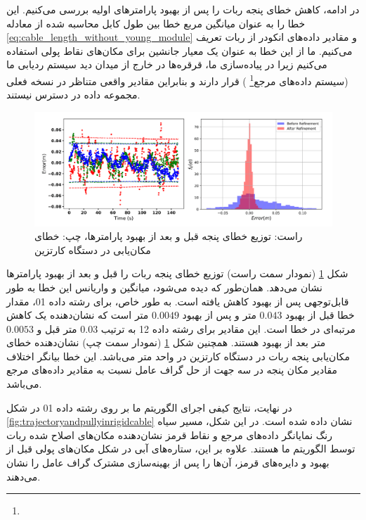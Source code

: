 در ادامه، کاهش خطای پنجه ربات را پس از بهبود پارامترهای اولیه بررسی می‌کنیم. این خطا را به عنوان میانگین مربع خطا بین طول کابل محاسبه شده از معادله 
\ref{eq:cable_length_without_young_module}
 و مقادیر داده‌های انکودر از ربات تعریف می‌کنیم. ما از این خطا به عنوان یک معیار جانشین برای مکان‌های نقاط پولی استفاده می‌کنیم زیرا در پیاده‌سازی ما، قرقره‌ها در خارج از میدان دید سیستم ردیابی ما (سیستم داده‌های مرجع\footnote{}
 ) قرار دارند و بنابراین مقادیر واقعی متناظر در نسخه فعلی مجموعه داده در دسترس نیستند. 
 
 \begin{figure}
 	\centering
 	\includegraphics[width=0.9\linewidth]{img/calibration_result_rigid}
 	\caption{ راست: توزیع خطای پنجه قبل و بعد از بهبود پارامترها، چپ: خطای مکان‌یابی در دستگاه کارتزین}
 	\label{fig:calibrationresultrigid}
 \end{figure}
 
 شکل 
 \ref{fig:calibrationresultrigid}
 (نمودار سمت راست)
 توزیع خطای پنجه ربات را قبل و بعد از بهبود پارامترها نشان می‌دهد. همان‌طور که دیده می‌شود، میانگین و واریانس این خطا به طور قابل‌توجهی پس از بهبود کاهش یافته است. به طور خاص، برای رشته داده 01، مقدار خطا قبل از بهبود $0.043$ متر و پس از بهبود $0.0049$ متر است که نشان‌دهنده یک کاهش مرتبه‌ای در خطا است. این مقادیر برای رشته داده 12 به ترتیب $0.03$ متر قبل و $0.0053$ متر بعد از بهبود هستند. همچنین شکل 
  \ref{fig:calibrationresultrigid}
  (نمودار سمت چپ)
  نشان‌دهنده خطای مکان‌یابی پنجه ربات در دستگاه کارتزین در واحد متر می‌باشد. این خطا بیانگر اختلاف مقادیر مکان پنجه در سه جهت از حل گراف عامل نسبت به مقادیر داده‌های مرجع می‌باشد.

در نهایت، نتایج کیفی اجرای الگوریتم ما بر روی رشته داده 01 در شکل 
\ref{fig:trajectoryandpullyinrigidcable} 
نشان داده شده است. در این شکل، مسیر سیاه رنگ نمایانگر داده‌های مرجع و نقاط قرمز نشان‌دهنده مکان‌های اصلاح شده ربات توسط الگوریتم ما هستند. علاوه بر این، ستاره‌های آبی در شکل مکان‌های پولی قبل از بهبود و دایره‌های قرمز، آن‌ها را پس از بهینه‌سازی مشترک گراف عامل را نشان می‌دهند.

